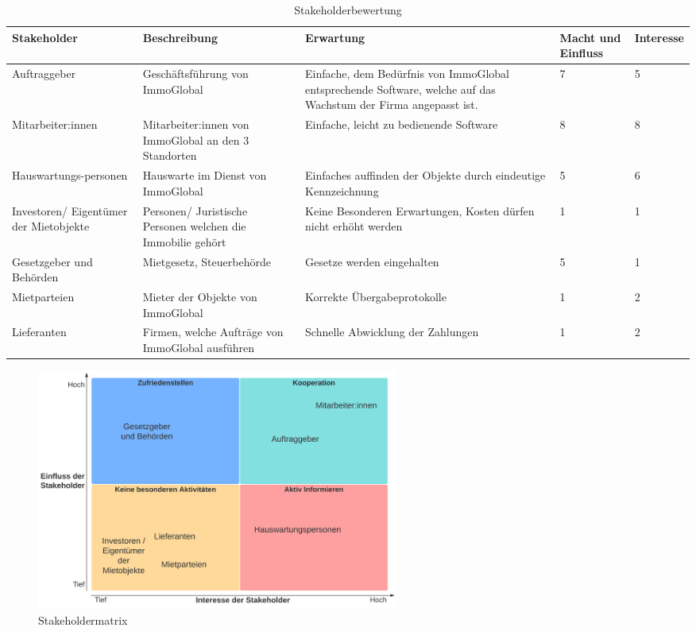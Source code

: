 \begin{table}[H]
  \centering
  \settowidth{}
  \setlength\extrarowheight{2pt}
  \begin{tabulary}{1.0\textwidth}{|L|L|L|a|z|}
    \hline
    \textbf{Stakeholder} & 
    \textbf{Beschreibung} & 
    \textbf{Erwartung}& 
    \textbf{Macht und Einfluss} & 
    \textbf{Interesse}\\
    \hline
    Auftraggeber & 
    Geschäftsführung von ImmoGlobal& 
    Einfache, dem Bedürfnis von ImmoGlobal entsprechende Software, welche auf das Wachstum der Firma angepasst ist. &
    7 &
    5 \\ 
    \hline
    Mitarbeiter:innen & 
    Mitarbeiter:innen von ImmoGlobal an den 3 Standorten & 
    Einfache, leicht zu bedienende Software&
    8 &
    8 \\
    \hline
    Hauswartungs-personen & 
    Hauswarte im Dienst von ImmoGlobal &
    Einfaches auffinden der Objekte durch eindeutige Kennzeichnung &
    5 &
    6 \\
    \hline
    Investoren/ Eigentümer der Mietobjekte & 
    Personen/ Juristische Personen welchen die Immobilie gehört &
    Keine Besonderen Erwartungen, Kosten dürfen nicht erhöht werden &
    1 &
    1 \\
    \hline
    Gesetzgeber und Behörden &
    Mietgesetz, Steuerbehörde &
    Gesetze werden eingehalten &
    5 &
    1 \\
    \hline
    Mietparteien & 
    Mieter der Objekte von ImmoGlobal &
    Korrekte Übergabeprotokolle &
    1 &
    2 \\
    \hline
    Lieferanten & 
    Firmen, welche Aufträge von ImmoGlobal ausführen &
    Schnelle Abwicklung der Zahlungen &
    1 &
    2 \\
    \hline
  \end{tabulary}
  \caption{Stakeholderbewertung}
  \label{Stakeholderbewertung}
\end{table}
\vspace*{-0.5cm}
\begin{figure}[H]
  \begin{center}
      \includegraphics[width=0.58\textwidth]{content/images/Stakeholdematrix.png}
      \caption{Stakeholdermatrix}
      \label{fig:Stakeholdermatrix}
    \end{center}
\end{figure}

